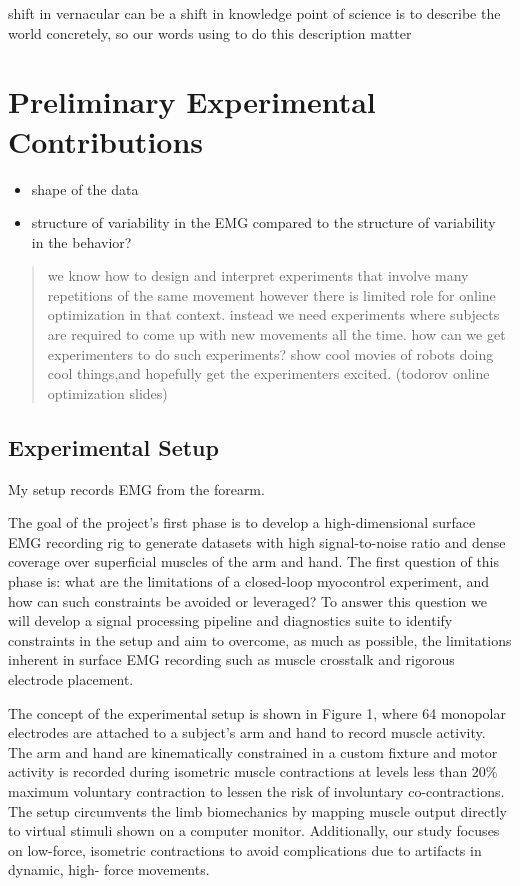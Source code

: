 \documentclass[
  a4paper,
]{article}
\providecommand{\tightlist}{%
  \setlength{\itemsep}{0pt}\setlength{\parskip}{0pt}}
\begin{document}
shift in vernacular can be a shift in knowledge point of science is to
describe the world concretely, so our words using to do this description
matter

\hypertarget{sec:experiment}{%
\section{Preliminary Experimental Contributions}\label{sec:experiment}}

\begin{itemize}
\tightlist
\item
  shape of the data
\item
  structure of variability in the EMG compared to the structure of
  variability in the behavior?
\end{itemize}

\begin{quote}
we know how to design and interpret experiments that involve many
repetitions of the same movement however there is limited role for
online optimization in that context. instead we need experiments where
subjects are required to come up with new movements all the time. how
can we get experimenters to do such experiments? show cool movies of
robots doing cool things,and hopefully get the experimenters excited.
(todorov online optimization slides)
\end{quote}

\hypertarget{experimental-setup}{%
\subsection{Experimental Setup}\label{experimental-setup}}

My setup records EMG from the forearm.

The goal of the project's first phase is to develop a high-dimensional
surface EMG recording rig to generate datasets with high signal-to-noise
ratio and dense coverage over superficial muscles of the arm and hand.
The first question of this phase is: what are the limitations of a
closed-loop myocontrol experiment, and how can such constraints be
avoided or leveraged? To answer this question we will develop a signal
processing pipeline and diagnostics suite to identify constraints in the
setup and aim to overcome, as much as possible, the limitations inherent
in surface EMG recording such as muscle crosstalk and rigorous electrode
placement.

The concept of the experimental setup is shown in Figure 1, where 64
monopolar electrodes are attached to a subject's arm and hand to record
muscle activity. The arm and hand are kinematically constrained in a
custom fixture and motor activity is recorded during isometric muscle
contractions at levels less than 20\% maximum voluntary contraction to
lessen the risk of involuntary co-contractions. The setup circumvents
the limb biomechanics by mapping muscle output directly to virtual
stimuli shown on a computer monitor. Additionally, our study focuses on
low-force, isometric contractions to avoid complications due to
artifacts in dynamic, high- force movements.
\end{document}
